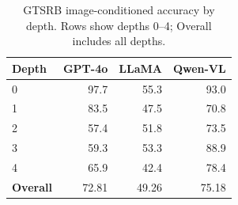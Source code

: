 \begin{table}[t]
\centering
\caption{GTSRB image-conditioned accuracy by depth. Rows show depths 0--4; Overall includes all depths.}
\label{tab:gtsrb_depth}
\footnotesize
\begin{tabular}{@{}lrrr@{}}
\toprule
\textbf{Depth} & \textbf{GPT-4o} & \textbf{LLaMA} & \textbf{Qwen-VL} \\
\midrule
0 & 97.7 & 55.3 & 93.0 \\
1 & 83.5 & 47.5 & 70.8 \\
2 & 57.4 & 51.8 & 73.5 \\
3 & 59.3 & 53.3 & 88.9 \\
4 & 65.9 & 42.4 & 78.4 \\
\midrule
\textbf{Overall} & 72.81 & 49.26 & 75.18 \\
\bottomrule
\end{tabular}
\end{table}
